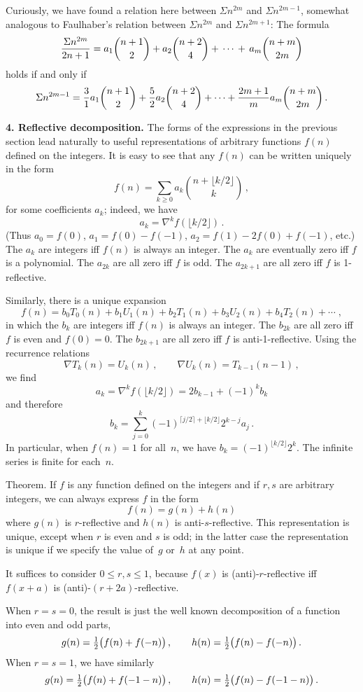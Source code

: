 Curiously, we have found a relation here between $\Sigma n^{2m}$ and
$\Sigma n^{2m-1}$, somewhat analogous to Faulhaber's relation between
$\Sigma n^{2m}$ and $\Sigma n^{2m+1}$: The formula
$${\Sigma n^{2m}\over 2n+1}={a_1{n+1\choose
2}+a_2{n+2\choose 4}+\,\cdots\,+\,a_m{n+m\choose 2m}}$$
holds if and only if
$$\Sigma n^{2m-1}={3\over 1}a_1{n+1\choose 2}+{5\over
2}a_2{n+2\choose 4}+\cdots +{2m+1\over m}a_m{n+m\choose 2m}\,.$$

\bigskip\noindent
{\bf 4. Reflective decomposition.}\enspace
The forms of the expressions in the previous section lead naturally to
useful representations of arbitrary 
functions $f(n)$ defined on the integers. It
is easy to see that any $f(n)$ can be written uniquely in the
form
$$f(n)=\sum_{k\geq0}a_k{n+\lfloor k/2\rfloor\choose k}\,,$$
for some coefficients $a_k$; indeed, we have
$$a_k=\nabla^kf(\lfloor k/2\rfloor)\,.$$
(Thus $a_0=f(0)$, $a_1=f(0)-f(-1)$, $a_2=f(1)-2f(0)+f(-1)$, etc.) The
$a_k$ are integers iff $f(n)$ is always an integer. The $a_k$ are
eventually zero iff $f$ is a polynomial. The $a_{2k}$ are all zero iff
$f$ is odd. The $a_{2k+1}$ are all zero iff $f$ is 1-reflective.

Similarly, there is a unique expansion
$$f(n)=b_0T_0(n)+b_1U_1(n)+b_2T_1(n)+b_3U_2(n)+b_4T_2(n)+\cdots\;,$$
in which the $b_k$ are integers iff $f(n)$ is always an integer. The
$b_{2k}$ are all zero iff $f$ is even and $f(0)=0$. The $b_{2k+1}$ are
all zero iff $f$ is anti-1-reflective. Using the recurrence relations
$$\nabla T_k(n)=U_k(n)\,,\qquad \nabla U_k(n)=T_{k-1}(n-1)\,,$$
we find
$$a_k=\nabla^kf(\lfloor k/2\rfloor)=2b_{k-1}+(-1)^kb_k$$
and therefore
$$b_k=\sum_{j=0}^k(-1)^{\lceil j/2\rceil+\lfloor
k/2\rfloor}2^{k-j}a_j\,.$$
In particular, when $f(n)=1$ for all~$n$, we have $b_k=(-1)^{\lfloor
k/2\rfloor} 2^k$. The infinite series is finite for each~$n$.

\proclaim
Theorem. If $f$ is any function defined on the integers and if $r,s$
are arbitrary integers, we can always express $f$ in the form
$$f(n)=g(n)+h(n)$$
where $g(n)$ is $r$-reflective and $h(n)$ is anti-$s$-reflective. This
representation is unique, except when $r$ is even and $s$ is odd; in
the latter case the representation is unique if we specify the value
of~$g$ or~$h$ at any point.

\proof
It suffices to consider $0\leq r,s\leq 1$, because $f(x)$ is
(anti)-$r$-reflective iff $f(x+a)$ is (anti)-$(r+2a)$-reflective. 

When $r=s=0$, the result is just the well known decomposition of a
function into even and odd parts,
$$g(n)={\textstyle{1\over 2}}\bigl(f(n)+f(-n)\bigr)\,,\qquad
h(n)={\textstyle{1\over 2}}\bigl(f(n)-f(-n)\bigr)\,.$$
When $r=s=1$, we have similarly
$$g(n)={\textstyle{1\over 2}}\bigl(f(n)+f(-1-n)\bigr)\,,\qquad
h(n)={\textstyle{1\over 2}}\bigl(f(n)-f(-1-n)\bigr)\,.$$

